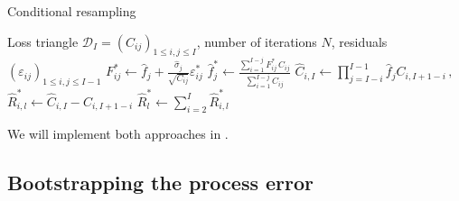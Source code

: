\documentclass[a4paper]{book}
\theoremstyle{plain}
\begin{document}
\begin{algorithm} \label{alg:conditional-resampling}
    \caption{Conditional resampling}
    \begin{algorithmic}
        \Require Loss triangle $\mathcal{D}_I = (C_{ij})_{1 \leq i, j \leq I}$, number of iterations $N$, residuals $(\varepsilon_{ij})_{1 \leq i, j \leq I - 1}$
        \vspace{2pt}
        \vspace{2pt}
                        \vspace{4pt}
                        \State $\displaystyle F^*_{ij} \gets \hat{f}_j + \frac{\hat{\sigma}_j}{\sqrt{C_{ij}}} \varepsilon^*_{ij}$
                        \vspace{4pt}
                    \EndFor
                    \vspace{4pt}
                        \State $\displaystyle \hat{f}^*_j \gets \frac{\sum_{i = 1}^{I - j}F^*_{ij} \, C_{ij}}{\sum_{i = 1}^{I - j} C_{ij}}$
                    \vspace{4pt}
                \EndFor
                \vspace{3pt}
                \State $\hat{C}_{i, I} \gets \prod_{j = I - i}^{I - 1} \hat{f}_j C_{i, I + 1 - i} \,,$
                \vspace{2pt}
                \State $\hat{R}^*_{i, l} \gets \hat{C}_{i, I} - C_{i, I + 1 - i}$
                \vspace{3pt}
            \EndFor
            \vspace{2pt}
            \State $\hat{R}^*_l \gets \sum_{i = 2}^I \hat{R}^*_{i, l}$
            \vspace{2pt}
        \EndFor
    \end{algorithmic}
\end{algorithm}
We will implement both approaches in .

\subsection{Bootstrapping the process error}
\end{document}
